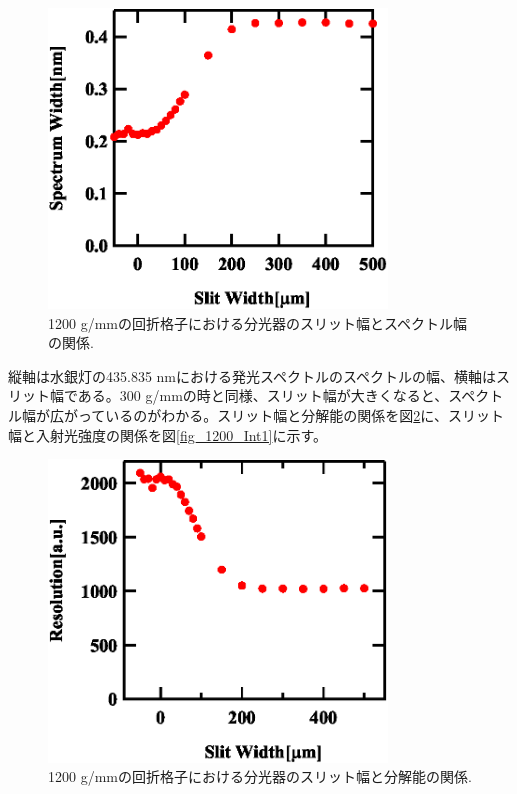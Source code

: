 \documentclass[11pt,a4j]{jsarticle}
\begin{document}
\begin{enumerate}
       \begin{figure}[ht]
        \centering
        \includegraphics[clip,width=9cm]{start1_1200Spectrum1.eps}
        \caption{1200 g/mmの回折格子における分光器のスリット幅とスペクトル幅の関係.}
        \label{fig_1200spectrum1}
       \end{figure}


       縦軸は水銀灯の435.835 nmにおける発光スペクトルのスペクトルの幅、横軸はスリット幅である。300 g/mmの時と同様、スリット幅が大きくなると、スペクトル幅が広がっているのがわかる。スリット幅と分解能の関係を図\ref{fig_1200_resolution1}に、スリット幅と入射光強度の関係を図\ref{fig_1200_Int1}に示す。

       \begin{figure}[t]
        \centering
        \includegraphics[clip,width=9cm]{start1_1200Resolution.eps}
        \caption{1200 g/mmの回折格子における分光器のスリット幅と分解能の関係.}
        \label{fig_1200_resolution1}
       \end{figure}


\end{enumerate}
\end{document}
